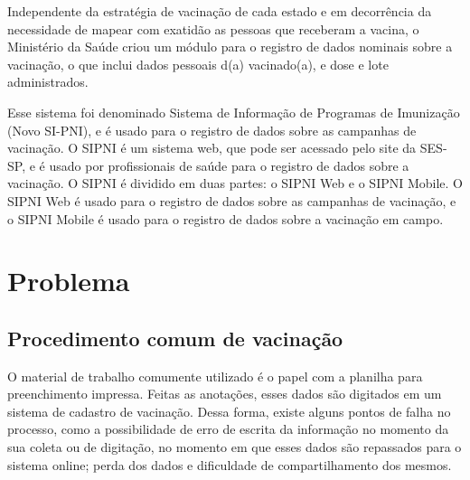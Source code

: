 Independente da estratégia de vacinação de cada estado e em decorrência da necessidade de mapear com exatidão as pessoas que receberam a vacina, o Ministério da Saúde criou um módulo para o registro de dados nominais sobre a vacinação, o que inclui dados pessoais d(a) vacinado(a), e dose e lote administrados.

Esse sistema foi denominado Sistema de Informação de Programas de Imunização (Novo SI-PNI), e é usado para o registro de dados sobre as campanhas de vacinação. O SIPNI é um sistema web, que pode ser acessado pelo site da SES-SP, e é usado por profissionais de saúde para o registro de dados sobre a vacinação. O SIPNI é dividido em duas partes: o SIPNI Web e o SIPNI Mobile. O SIPNI Web é usado para o registro de dados sobre as campanhas de vacinação, e o SIPNI Mobile é usado para o registro de dados sobre a vacinação em campo.


\section{Problema}


\subsection{Procedimento comum de vacinação}
\label{SubSec:cap1:ProcedimentoComumVacinacao}
O material de trabalho comumente utilizado é o papel com a planilha para preenchimento impressa. Feitas as anotações, esses dados são digitados em um sistema de cadastro de vacinação. Dessa forma, existe alguns pontos de falha no processo, como a possibilidade de erro de escrita da informação no momento da sua coleta ou de digitação, no momento em que esses dados são repassados para o sistema online; perda dos dados e dificuldade de compartilhamento dos mesmos.


